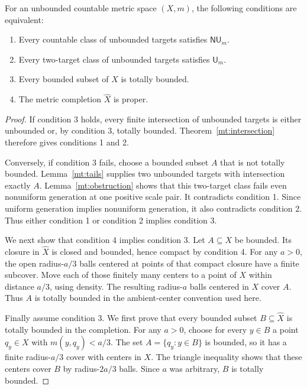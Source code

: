 \begin{theorem}
\label{mt:proper}
For an unbounded countable metric space $(X,m)$, the following conditions
are equivalent:
\begin{enumerate}
\item Every countable class of unbounded targets satisfies
$\mathsf{NU}_m$.
\item Every two-target class of unbounded targets satisfies
$\mathsf U_m$.
\item Every bounded subset of $X$ is totally bounded.
\item The metric completion $\widehat X$ is proper.
\end{enumerate}
\end{theorem}
\begin{proof}
If condition 3 holds, every finite intersection of unbounded targets is
either unbounded or, by condition 3, totally bounded. Theorem~\ref{mt:intersection}
therefore gives conditions 1 and 2.

Conversely, if condition 3 fails, choose a bounded subset $A$ that is
not totally bounded. Lemma~\ref{mt:tails} supplies two unbounded targets
with intersection exactly $A$. Lemma~\ref{mt:obstruction} shows that
this two-target class fails even nonuniform generation at one positive
scale pair. It contradicts condition 1. Since uniform generation implies
nonuniform generation, it also contradicts condition 2. Thus either
condition 1 or condition 2 implies condition 3.

We next show that condition 4 implies condition 3. Let $A\subseteq X$
be bounded. Its closure in $\widehat X$ is closed and bounded, hence
compact by condition 4. For any $a>0$, the open radius-$a/3$ balls
centered at points of that compact closure have a finite subcover.
Move each of those finitely many centers to a point of $X$ within
distance $a/3$, using density. The resulting radius-$a$ balls centered
in $X$ cover $A$. Thus $A$ is totally bounded in the ambient-center
convention used here.

Finally assume condition 3. We first prove that every bounded subset
$B\subseteq\widehat X$ is totally bounded in the completion. For any
$a>0$, choose for every $y\in B$ a point $q_y\in X$ with
$m(y,q_y)<a/3$. The set $A=\{q_y:y\in B\}$ is bounded, so it has
a finite radius-$a/3$ cover with centers in $X$. The triangle inequality
shows that these centers cover $B$ by radius-$2a/3$ balls. Since $a$
was arbitrary, $B$ is totally bounded.


\end{proof}
